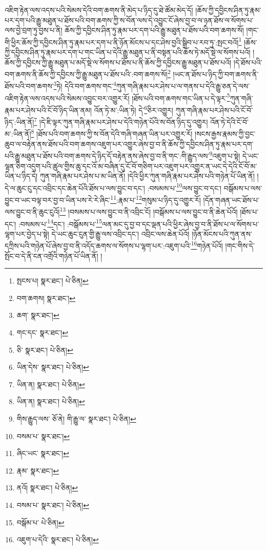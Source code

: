 འཇིག་རྟེན་ལས་འདས་པའི་སེམས་དེའི་བག་ཆགས་ནི་མེད་པ་ཉིད་དུ་ཐེ་ཚོམ་མེད་དོ། །ཆོས་ཀྱི་དབྱིངས་ཤིན་ཏུ་རྣམ་པར་དག་པའི་རྒྱུ་མཐུན་པ་ཐོས་པའི་བག་ཆགས་ཀྱི་ས་བོན་ལས་དེ་འབྱུང་ངོ་ཞེས་བྱ་བ་ལ་ཉན་ཐོས་ལ་སོགས་པ་ལས་བྱེ་བྲག་ཏུ་བྱས་པ་ནི། ཆོས་ཀྱི་དབྱིངས་ཤིན་ཏུ་རྣམ་པར་དག་པའི་རྒྱུ་མཐུན་པ་ཐོས་པའི་བག་ཆགས་སོ། །གང་གི་ཕྱིར་ཆོས་ཀྱི་དབྱིངས་ཤིན་ཏུ་རྣམ་པར་དག་པ་ནི་ཉོན་མོངས་པ་དང་ཤེས་བྱའི་སྒྲིབ་པ་རབ་ཏུ་:སྤང་བའོ།\footnote{སྤངས་པ།  སྣར་ཐང་།  པེ་ཅིན། } །ཆོས་ཀྱི་དབྱིངས་ཤིན་ཏུ་རྣམ་པར་དག་པ་གང་ཡིན་པ་དེའི་རྒྱུ་མཐུན་པ་ནི་བསྟན་པའི་ཆོས་ཏེ་མདོ་སྡེ་ལ་སོགས་པའོ། །ཆོས་ཀྱི་དབྱིངས་ཀྱི་རྒྱུ་མཐུན་པ་མདོ་སྡེ་ལ་སོགས་པ་ཐོས་པ་ནི་ཆོས་ཀྱི་དབྱིངས་རྒྱུ་མཐུན་པ་ཐོས་པའོ། །དེ་ཐོས་པའི་བག་ཆགས་ནི་ཆོས་ཀྱི་དབྱིངས་ཀྱི་རྒྱུ་མཐུན་པ་ཐོས་པའི་:བག་ཆགས་སོ།\footnote{བག་ཆགས།  སྣར་ཐང་། } །ཡང་ན་ཐོས་པ་ཉིད་ཀྱི་བག་ཆགས་ནི་ཐོས་པའི་བག་ཆགས་\footnote{ཆག་  སྣར་ཐང་། }ཏེ། དེའི་བག་ཆགས་གང་\footnote{གང་དང་  སྣར་ཐང་། }ཀུན་གཞི་རྣམ་པར་ཤེས་པ་ལ་གནས་པ་དེའི་རྒྱུ་ཅན་དེ་ལས་འཇིག་རྟེན་ལས་འདས་པའི་སེམས་འབྱུང་བར་འགྱུར་རོ། །ཐོས་པའི་བག་ཆགས་གང་ཡིན་པ་དེ་ལྟར་\footnote{ཅི་  སྣར་ཐང་།  པེ་ཅིན། }ཀུན་གཞི་རྣམ་པར་ཤེས་པའི་ངོ་བོ་ཉིད་ཡིན་ནམ། འོན་ཏེ་མ་:ཡིན་ཏེ། དེ་\footnote{ཡིན་དེས་  སྣར་ཐང་།  པེ་ཅིན། }ཅིར་འགྱུར། ཀུན་གཞི་རྣམ་པར་ཤེས་པའི་ངོ་བོ་ཉིད་:ཡིན་ནོ།\footnote{ཡིན་ན།  སྣར་ཐང་།  པེ་ཅིན། } །དེ་ཇི་ལྟར་ཀུན་གཞི་རྣམ་པར་ཤེས་པ་དེའི་གཉེན་པོའི་ས་བོན་ཉིད་དུ་འགྱུར། འོན་ཏེ་དེའི་ངོ་བོ་མ་:ཡིན་ནོ།\footnote{ཡིན་ན།  སྣར་ཐང་།  པེ་ཅིན། } །ཐོས་པའི་བག་ཆགས་ཀྱི་ས་བོན་དེའི་གཞི་གཞན་ཡིན་པར་འགྱུར་རོ། །སངས་རྒྱས་རྣམས་ཀྱི་བྱང་ཆུབ་ལ་བརྟེན་ནས་ཐོས་པའི་བག་ཆགས་འཇུག་པར་འགྱུར་ཞེས་བྱ་བ་ནི་ཆོས་ཀྱི་དབྱིངས་ཤིན་ཏུ་རྣམ་པར་དག་པའི་རྒྱུ་མཐུན་པ་ཐོས་པའི་བག་ཆགས་དེ་ཉིད་དོ་བརྟེན་ནས་ཞེས་བྱ་བ་ནི་གང་:གི་རྒྱུད་ལས་\footnote{གིས་རྒྱུད་ལས་  ཅོ་ནེ། གི་རྒྱུ་ལ་  སྣར་ཐང་།  པེ་ཅིན། }འཇུག་པ་སྟེ། དེ་ཡང་ལྷན་ཅིག་འདུག་པའི་ཚུལ་གྱིས་ཆུ་དང་འོ་མ་བཞིན་དུ་ངོ་བོ་གཅིག་པར་འཇུག་པར་འགྱུར་ན་ཡང་དེ་དེའི་ངོ་བོ་མ་ཡིན་པ་ཉིད་དེ། ཀུན་གཞི་རྣམ་པར་ཤེས་པ་མ་ཡིན་ནོ། །དེའི་ཕྱིར་ཀུན་གཞི་རྣམ་པར་ཤེས་པའི་གཉེན་པོ་ཡིན་ནོ། །དེ་ལ་ཆུང་ངུ་དང་འབྲིང་དང་ཆེན་པོའི་ཐོས་པ་ལས་བྱུང་བ་དང་། :བསམས་པ་\footnote{བསམ་པ་  སྣར་ཐང་། }ལས་བྱུང་བ་དང་། བསྒོམས་པ་ལས་བྱུང་བ་ཡང་བལྟ་བར་བྱ་བ་ཡིན་པས་རེ་རེ་ཞིང་\footnote{ཞིང་ཡང་  སྣར་ཐང་། }:རྣམ་པ་\footnote{རྣམ་  སྣར་ཐང་། }གསུམ་པ་ཉིད་དུ་འགྱུར་རོ། །དོན་གཞན་ཡང་ཐོས་པ་ལས་བྱུང་བ་ནི་ཆུང་ངུའོ།\footnote{ནའོ།  སྣར་ཐང་།  པེ་ཅིན། } །བསམས་པ་ལས་བྱུང་བ་ནི་འབྲིང་ངོ། །བསྒོམས་པ་ལས་བྱུང་བ་ནི་ཆེན་པོའོ། །ཐོས་པ་དང་། :བསམས་པ་\footnote{བསམ་པ་  སྣར་ཐང་།  པེ་ཅིན། }དང་། :བསྒོམས་པ་\footnote{བསྒོམ་པ་  པེ་ཅིན། }ལན་མང་དུ་བྱ་བ་དང་ལྡན་པའི་ཕྱིར་ཞེས་བྱ་བ་ནི་ཐོས་པ་ལ་སོགས་པ་ལྷག་པར་བྱེད་པ་སྟེ། དེ་ཡང་ཆུང་ངུན་གྱི་རྒྱུ་ལས་འབྲིང་དང་། འབྲིང་ལས་ཆེན་པོའོ། །ཉོན་མོངས་པའི་ཀུན་ནས་དཀྲིས་པའི་གཉེན་པོ་ཞེས་བྱ་བ་ནི་འདོད་ཆགས་ལ་སོགས་པ་ལྷག་པར་:འཇུག་པའི་\footnote{འཇུག་པ་དེའི་  སྣར་ཐང་།  པེ་ཅིན། }གཉེན་པོའོ། །གང་གིས་དེ་སྤོང་བ་དེ་ནི་ངན་འགྲོའི་གཉེན་པོ་ཡིན་ནོ། །
